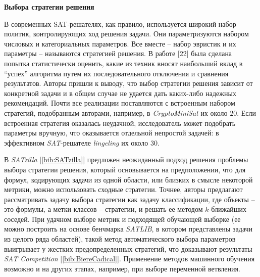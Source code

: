 \textbf{Выбора стратегии решения}

В современных SAT-решателях, как правило, используется широкий набор политик, контролирующих ход решения задачи. Они параметризуются набором числовых и категориальных параметров. Все вместе – набор эвристик и их параметры – называются стратегией решения. В работе [22] была сделана попытка статистически оценить, какие из техник вносят наибольший вклад в \enquote{успех} алгоритма путем их последовательного отключения и сравнения результатов. Авторы пришли к выводу, что выбор стратегии решения зависит от конкретной задачи и в общем случае не удается дать каких-либо надежных рекомендаций. Почти все реализации поставляются с встроенным набором стратегий, подобранным авторами, 
например, в \textit{CryptoMiniSat} их около $20$. Если встроенная стратегия оказалась неудачной, исследователь может подобрать параметры вручную, что оказывается отдельной непростой задачей: в эффективном \textit{SAT}-решателе \textit{lingeling} их около 30.

В \textit{SATzilla} [\ref{bib:SATzilla}] предложен неожиданный подход решения проблемы выбора стратегии решения, который основывается на предположении, что для формул, кодирующих задачи из одной области, или близких в смысле некоторой метрики, можно использовать сходные стратегии. Точнее, авторы предлагают рассматривать задачу выбора стратегии как задачу классификации, где объекты – это формулы, а метки классов – стратегии, и решать ее методом $k$-ближайших соседей. При удачном выборе метрик и подходящей обучающей выборке (ее можно построить на основе бенчмарка \textit{SATLIB}, в котором представлены задачи из целого ряда областей), такой метод автоматического выбора параметров выигрывает у жестких предопределенных стратегий, что доказывают результаты \textit{SAT Competition} [\ref{bib:BiereCadical}]. Применение методов машинного обучения возможно и на других этапах, например, при выборе переменной ветвления.

